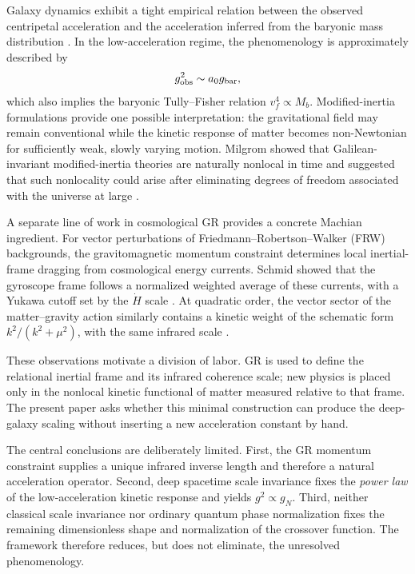 \documentclass[11pt]{article}
\begin{document}
Galaxy dynamics exhibit a tight empirical relation between the observed centripetal acceleration and the acceleration inferred from the baryonic mass distribution \cite{McGaugh2016RAR}. In the low-acceleration regime, the phenomenology is approximately described by
\begin{equation}
    g_{\rm obs}^2 \sim a_0 g_{\rm bar},
\end{equation}
which also implies the baryonic Tully--Fisher relation $v_f^4\propto M_b$. Modified-inertia formulations provide one possible interpretation: the gravitational field may remain conventional while the kinetic response of matter becomes non-Newtonian for sufficiently weak, slowly varying motion. Milgrom showed that Galilean-invariant modified-inertia theories are naturally nonlocal in time and suggested that such nonlocality could arise after eliminating degrees of freedom associated with the universe at large \cite{Milgrom1994}.

A separate line of work in cosmological GR provides a concrete Machian ingredient. For vector perturbations of Friedmann--Robertson--Walker (FRW) backgrounds, the gravitomagnetic momentum constraint determines local inertial-frame dragging from cosmological energy currents. Schmid showed that the gyroscope frame follows a normalized weighted average of these currents, with a Yukawa cutoff set by the $\dot H$ scale \cite{Schmid2008a,Schmid2008b}. At quadratic order, the vector sector of the matter--gravity action similarly contains a kinetic weight of the schematic form $k^2/(k^2+\mu^2)$, with the same infrared scale \cite{DeFeliceProc}.

These observations motivate a division of labor. GR is used to define the relational inertial frame and its infrared coherence scale; new physics is placed only in the nonlocal kinetic functional of matter measured relative to that frame. The present paper asks whether this minimal construction can produce the deep-galaxy scaling without inserting a new acceleration constant by hand.

The central conclusions are deliberately limited. First, the GR momentum constraint supplies a unique infrared inverse length and therefore a natural acceleration operator. Second, deep spacetime scale invariance fixes the \emph{power law} of the low-acceleration kinetic response and yields $g^2\propto g_N$. Third, neither classical scale invariance nor ordinary quantum phase normalization fixes the remaining dimensionless shape and normalization of the crossover function. The framework therefore reduces, but does not eliminate, the unresolved phenomenology.
\end{document}
